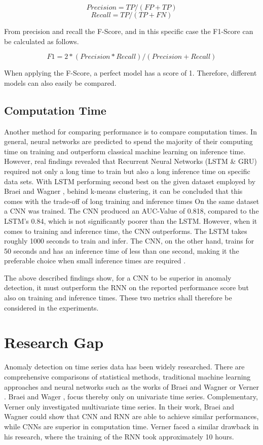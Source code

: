 \[Precision = TP/(FP+TP)\]
\[Recall = TP/(TP+FN)\]

From precision and recall the F-Score, and in this specific case the F1-Score can be calculated as follows.

\[F1 = 2*(Precision*Recall)/(Precision+Recall)\]

When applying the F-Score, a perfect model has a score of 1. Therefore, different models can also easily be compared. 


\subsection{Computation Time}

Another method for comparing performance is to compare computation times.
In general, neural networks are predicted to spend the majority of their computing time on training and outperform classical machine learning on inference time. However, real findings revealed that Recurrent Neural Networks (LSTM \& GRU) required not only a long time to train but also a long inference time on specific data sets. With LSTM performing second best on the given dataset employed by Braei and Wagner \parencite*{Braei2020}, behind k-means clustering, it can be concluded that this comes with the trade-off of long training and inference times
On the same dataset a CNN was trained. The CNN produced an AUC-Value of 0.818, compared to the LSTM's 0.84, which is not significantly poorer than the LSTM. However, when it comes to training and inference time, the CNN outperforms. The LSTM takes roughly 1000 seconds to train and infer. The CNN, on the other hand, trains for 50 seconds and has an inference time of less than one second, making it the preferable choice when small inference times are required \parencite{Braei2020}. 

The above described findings show, for a CNN to be superior in anomaly detection, it must outperform the RNN on the reported performance score but also on training and inference times. These two metrics shall therefore be considered in the experiments.

\section{Research Gap}
Anomaly detection on time series data has been widely researched. There are comprehensive comparisons of statistical methods, traditional machine learning approaches and neural networks such as the works of Braei and Wagner \parencite*{Braei2020} or Verner \parencite*{Verner2019}. Braei and Wager \parencite*{Braei2020}, focus thereby only on univariate time series. Complementary, Verner \parencite*{Verner2019} only investigated multivariate time series. In their work, Braei and Wagner \parencite*{Braei2020} could show that CNN and RNN are able to achieve similar performances, while CNNs are superior in computation time. Verner \parencite*{Verner2019} faced a similar drawback in his research, where the training of the RNN took approximately 10 hours. 

